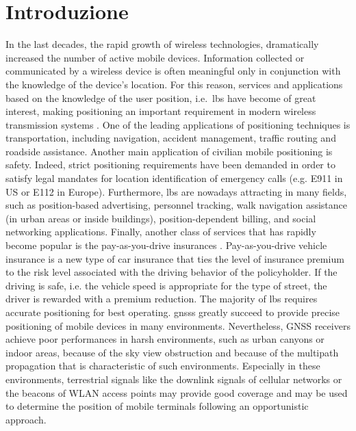 \chapter{Introduzione}
\label{chap:Introduction}
\glsresetall
In the last decades, the rapid growth of wireless technologies, dramatically increased the number of 
active mobile devices. Information collected or communicated by a wireless device is often meaningful 
only in conjunction with the knowledge of the device's location. For this reason, services and applications 
based on the knowledge of the user position, i.e.~\gls{lbs} have become of great interest, making
positioning an important requirement in modern wireless transmission systems \cite{Positioning_book1,Positioning_book2,Locating_the_nodes_cooperative_localization,Localization_via_ultra_wideband_radios_a_look}.
One of the leading applications of positioning techniques is transportation, including navigation, 
accident management, traffic routing and roadside assistance.
Another main application of civilian mobile positioning is safety. Indeed, strict  
positioning requirements have been demanded in order to satisfy legal mandates 
for location identification of emergency calls (e.g. E911 in US or E112 in Europe). 
Furthermore, \gls{lbs} are nowadays attracting in many fields, such as position-based advertising, 
personnel tracking, walk navigation assistance (in urban areas or inside buildings), 
position-dependent billing, 
and social networking applications. Finally, another class of services that has 
rapidly become popular is the pay-as-you-drive insurances \cite{Pay_as_you_drive_insurance}. 
Pay-as-you-drive vehicle insurance is a new type of car insurance that
ties the level of insurance premium to the risk level associated with the driving behavior of
the policyholder. If the driving is safe, i.e. the vehicle speed is appropriate for 
the type of street, the driver is rewarded with a premium reduction. 
The majority of \gls{lbs} requires accurate positioning for best operating.  
\glspl{gnss} greatly succeed to provide precise positioning of mobile devices in many 
environments. Nevertheless, GNSS receivers achieve poor performances in harsh 
environments, such as urban canyons or indoor areas, because of the sky view obstruction and 
because of the multipath propagation that is characteristic of such environments. 
Especially in these environments, terrestrial signals like the downlink signals of cellular networks 
or the beacons of WLAN access points may provide good coverage and may be used to determine the position 
of mobile terminals following an opportunistic approach.
